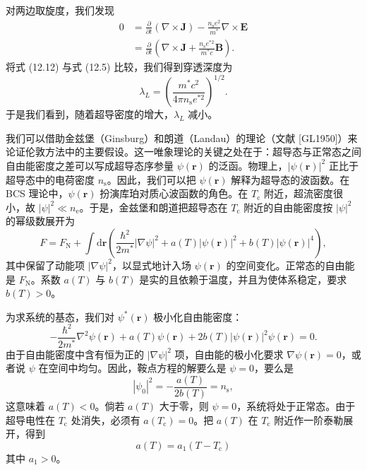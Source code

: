 对两边取旋度，我们发现
\begin{align*}
0&=\frac{\partial}{\partial t}\left(\nabla\times\mathbf{J}\right)-\frac{n_{\mathrm{s}}e^{2}}{m^{*}}\nabla\times\mathbf{E}\\
&=\frac{\partial}{\partial t}\left(\nabla\times\mathbf{J}+\frac{n_{\mathrm{s}}e^{*2}}{m^{*}c}\mathbf{B}\right).\tag{12.12}
\end{align*}
将式 (12.12) 与式 (12.5) 比较，我们得到穿透深度为
\begin{equation*}
\lambda_{L}=\left(\frac{m^{*}c^{2}}{4\pi n_{\mathrm{s}}e^{*2}}\right)^{1/2}.\tag{12.13}
\end{equation*}
于是我们看到，随着超导密度的增大，$\lambda_{L}$ 减小。

我们可以借助金兹堡（Ginsburg）和朗道（Landau）的理论（文献 [GL1950]）来论证伦敦方法中的主要假设。这一唯象理论的关键之处在于：超导态与正常态之间自由能密度之差可以写成超导态序参量 $\psi(\mathbf{r})$ 的泛函。物理上，$|\psi(\mathbf{r})|^{2}$ 正比于超导态中的电荷密度 $n_{\mathrm{s}}$。因此，我们可以把 $\psi(\mathbf{r})$ 解释为超导态的波函数。在 BCS 理论中，$\psi(\mathbf{r})$ 扮演库珀对质心波函数的角色。在 $T_{\mathrm{c}}$ 附近，超流密度很小，故 $|\psi|^{2}\ll n_{\mathrm{e}}$。于是，金兹堡和朗道把超导态在 $T_{\mathrm{c}}$ 附近的自由能密度按 $|\psi|^{2}$ 的幂级数展开为
\begin{equation*}
F=F_{\mathrm{N}}+\int\mathrm{d}\mathbf{r}\left(\frac{\hbar^{2}}{2m^{*}}|\nabla\psi|^{2}+a(T)|\psi(\mathbf{r})|^{2}+b(T)|\psi(\mathbf{r})|^{4}\right),\tag{12.14}
\end{equation*}
其中保留了动能项 $|\nabla\psi|^{2}$，以显式地计入场 $\psi(\mathbf{r})$ 的空间变化。正常态的自由能是 $F_{\mathrm{N}}$。系数 $a(T)$ 与 $b(T)$ 是实的且依赖于温度，并且为使体系稳定，要求 $b(T)>0$。

为求系统的基态，我们对 $\psi^{*}(\mathbf{r})$ 极小化自由能密度：
\begin{equation*}
-\frac{\hbar^{2}}{2m^{*}}\nabla^{2}\psi(\mathbf{r})+a(T)\psi(\mathbf{r})+2b(T)|\psi(\mathbf{r})|^{2}\psi(\mathbf{r})=0.\tag{12.15}
\end{equation*}
由于自由能密度中含有恒为正的 $|\nabla\psi|^{2}$ 项，自由能的极小化要求 $\nabla\psi(\mathbf{r})=0$，或者说 $\psi$ 在空间中均匀。因此，鞍点方程的解要么是 $\psi=0$，要么是
\begin{equation*}
|\psi_{0}|^{2}=-\frac{a(T)}{2b(T)}=n_{\mathrm{s}},\tag{12.16}
\end{equation*}
这意味着 $a(T)<0$。倘若 $a(T)$ 大于零，则 $\psi=0$，系统将处于正常态。由于超导电性在 $T_{\mathrm{c}}$ 处消失，必须有 $a(T_{\mathrm{c}})=0$。把 $a(T)$ 在 $T_{\mathrm{c}}$ 附近作一阶泰勒展开，得到
\begin{equation*}
a(T)=a_{1}(T-T_{\mathrm{c}})\tag{12.17}
\end{equation*}
其中 $a_{1}>0$。

